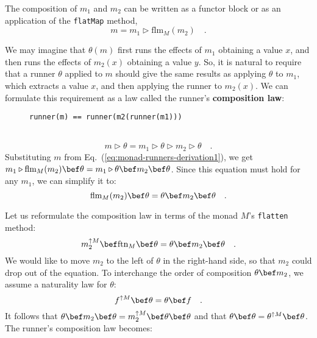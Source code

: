 \noindent The composition of $m_{1}$ and $m_{2}$ can be written
as a functor block or as an application of the \lstinline!flatMap!
method,
\begin{equation}
m=m_{1}\triangleright\text{flm}_{M}(m_{2})\quad.\label{eq:monad-runners-derivation1}
\end{equation}
\vspace{-1.2\baselineskip}

We may imagine that $\theta\left(m\right)$ first runs the effects
of $m_{1}$ obtaining a value $x$, and then runs the effects of $m_{2}(x)$
obtaining a value $y$. So, it is natural to require that a runner
$\theta$ applied to $m$ should give the same results as applying
$\theta$ to $m_{1}$, which extracts a value $x$, and then applying
the runner to $m_{2}(x)$. We can formulate this requirement as a
law called the runner\textsf{'}s \textbf{composition
law}:

\begin{wrapfigure}{l}{0.4\columnwidth}%
\vspace{-0.25\baselineskip}

\begin{lstlisting}
runner(m) == runner(m2(runner(m1)))
\end{lstlisting}
\vspace{-0.2\baselineskip}
\end{wrapfigure}%

~\vspace{-1\baselineskip}
\[
m\triangleright\theta=m_{1}\triangleright\theta\triangleright m_{2}\triangleright\theta\quad.
\]
Substituting $m$ from Eq.~(\ref{eq:monad-runners-derivation1}),
we get $m_{1}\triangleright\text{flm}_{M}(m_{2})\bef\theta=m_{1}\triangleright\theta\bef m_{2}\bef\theta$.
Since this equation must hold for any $m_{1}$, we can simplify it
to:
\[
\text{flm}_{M}(m_{2})\bef\theta=\theta\bef m_{2}\bef\theta\quad.
\]

Let us reformulate the composition law in terms of the monad $M$\textsf{'}s
\lstinline!flatten! method:
\[
m_{2}^{\uparrow M}\bef\text{ftn}_{M}\bef\theta=\theta\bef m_{2}\bef\theta\quad.
\]
We would like to move $m_{2}$ to the left of $\theta$ in the right-hand
side, so that $m_{2}$ could drop out of the equation. To interchange
the order of composition $\theta\bef m_{2}$, we assume a naturality
law for $\theta$:
\begin{equation}
f^{\uparrow M}\bef\theta=\theta\bef f\quad.\label{eq:runner-naturality-law}
\end{equation}
It follows that $\theta\bef m_{2}\bef\theta=m_{2}^{\uparrow M}\bef\theta\bef\theta$
and that $\theta\bef\theta=\theta^{\uparrow M}\bef\theta$. The runner\textsf{'}s
composition law becomes:

